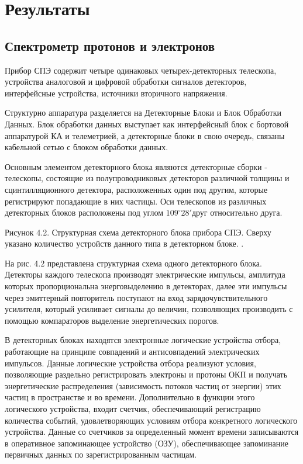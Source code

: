 
\chapter{Результаты}\label{chapt4}

\section{Спектрометр протонов и электронов}
Прибор СПЭ содержит четыре одинаковых четырех-детекторных телескопа, устройства аналоговой и цифровой обработки сигналов детекторов, интерфейсные устройства, источники вторичного напряжения. 

Структурно аппаратура разделяется на Детекторные Блоки и Блок Обработки Данных. Блок обработки данных выступает как интерфейсный блок с бортовой аппаратурой КА и телеметрией, а детекторные блоки  в свою очередь, связаны кабельной сетью с блоком обработки данных.

Основным элементом детекторного блока являются детекторные сборки - телескопы, состоящие из полупроводниковых детекторов различной толщины и сцинтилляционного детектора, расположенных один под другим, которые регистрируют попадающие в них частицы. Оси телескопов из различных детекторных блоков расположены под углом $ 109^\circ28'  $друг относительно друга. 

Рисунок 4.2. Структурная схема детекторного блока прибора СПЭ. Сверху указано количество устройств данного типа в детекторном блоке.
.

На  рис. 4.2 представлена структурная схема одного детекторного блока. Детекторы каждого телескопа производят электрические импульсы, амплитуда которых пропорциональна энерговыделению в детекторах, далее эти импульсы через эмиттерный повторитель поступают на вход зарядочувствительного усилителя, который усиливает сигналы до величин, позволяющих производить с помощью компараторов выделение энергетических порогов.

В детекторных блоках находятся электронные логические устройства отбора, работающие на принципе совпадений и антисовпадений электрических импульсов. Данные логические устройства отбора реализуют условия, позволяющие раздельно регистрировать электроны и протоны ОКП и получать энергетические распределения (зависимость потоков частиц от энергии) этих частиц в пространстве и во времени.  Дополнительно в функции этого логического устройства, входит счетчик, обеспечивающий регистрацию количества событий, удовлетворяющих условиям отбора конкретного логического устройства. Данные со счетчиков за определенный момент времени записываются в оперативное запоминающее устройство (ОЗУ), обеспечивающее запоминание первичных данных по зарегистрированным частицам. 

